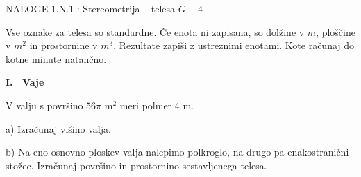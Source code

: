 \documentclass[a4paper,11pt]{letter}
\renewcommand{\headrulewidth}{3pt}
\renewcommand{\headrulewidth}{0.3pt}
\newcommand{\razdelek}[1]{%
  \vspace{0.5cm}
  \begin{center}
  \colorbox{brown!25}{\parbox{0.97\textwidth}{\centering\vspace{2pt}\large\textbf{#1}\vspace{2pt}}}
  \end{center}
  \vspace{0.2cm}
}
\begin{document}
\pagestyle{fancy}
\renewcommand\headrulewidth{0pt}
\lhead{}\chead{}\rhead{}
\rfoot{\vspace*{-2\baselineskip}}
\renewcommand{\vec}{\overrightarrow}
\everymath{\displaystyle}

\begin{minipage}{20cm}
\begin{bclogo}[couleur=brown!40,
  arrondi=0,ombre=true, couleurOmbre=gray!50,
logo =\bcplume,
  noborder=true]
{\textrm{{\Large{NALOGE 1.N.1} \Huge{}:
\large{Stereometrija -- telesa} \hfill $G-4$}}}
\end{bclogo}
\end{minipage}
\begin{minipage}{20cm}
\end{minipage}

\vspace{0.3cm}
\small
Vse oznake za telesa so standardne. Če enota ni zapisana, so dolžine v $m$, ploščine v $m^2$
in prostornine v $m^3$. Rezultate zapiši z ustreznimi enotami. Kote računaj do kotne minute natančno.
\normalsize

\razdelek{I. \ Vaje}

\begin{naloga}
V valju s površino $56\pi$ m$^2$ meri polmer 4 m.

a) Izračunaj višino valja.

b) Na eno osnovno ploskev valja nalepimo polkroglo, na drugo pa enakostranični stožec.
Izračunaj površino in prostornino sestavljenega telesa.
\end{naloga}
\end{document}
